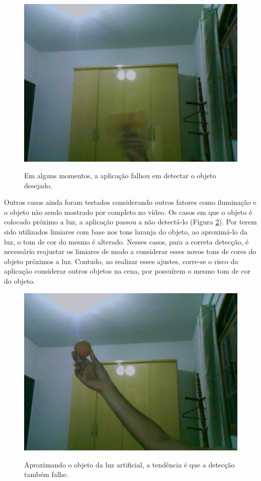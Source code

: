 \begin{figure}[H]
    \centering
    {\includegraphics[scale=0.25]{figuras/res_complexo_fail}}
    \caption{Em alguns momentos, a aplicação falhou em detectar o objeto desejado.}
    \label{img:res_complexo_fail}
\end{figure}

Outros casos ainda foram testados considerando outros fatores como iluminação e o objeto não sendo mostrado por completo no vídeo. Os casos em que o objeto é colocado próximo a luz, a aplicação passou a não detectá-lo (Figura \ref{img:res_complexo_luz}). Por terem sido utilizados limiares com base nos tons laranja do objeto, ao aproximá-lo da luz, o tom de cor do mesmo é alterado. Nesses casos, para a correta detecção, é necessário reajustar os limiares de modo a considerar esses novos tons de cores do objeto próximos a luz. Contudo, ao realizar esses ajustes, corre-se o risco da aplicação considerar outros objetos na cena, por possuírem o mesmo tom de cor do objeto.

\begin{figure}[H]
    \centering
    {\includegraphics[scale=0.25]{figuras/res_complexo_luz}}
    \caption{Aproximando o objeto da luz artificial, a tendência é que a detecção também falhe.}
    \label{img:res_complexo_luz}
\end{figure}

